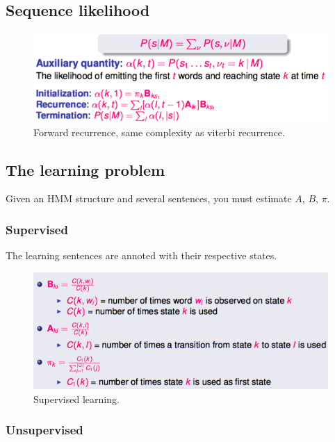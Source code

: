 \newpage

\subsection{Sequence likelihood}

\begin{figure}[htp]
	\centering
	\includegraphics[scale=0.6]{images/32_forward.png}
 	\caption{Forward recurrence, same complexity as viterbi recurrence.}
\end{figure}

\subsection{The learning problem}

Given an HMM structure and several sentences, you must estimate $A$, $B$, $\pi$.

\subsubsection{Supervised}

The learning sentences are annoted with their respective states.

\begin{figure}[htp]
	\centering
	\includegraphics[scale=0.6]{images/33_supervised.png}
 	\caption{Supervised learning.}
\end{figure}


\subsubsection{Unsupervised}

